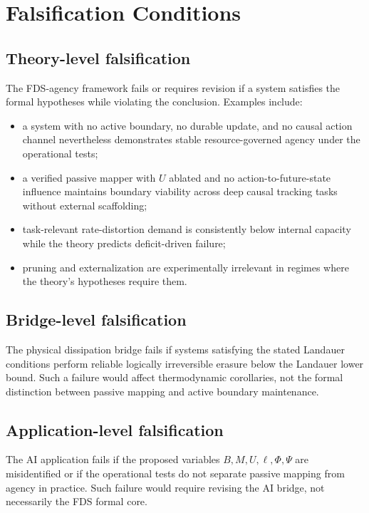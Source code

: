 \documentclass[10pt,a4paper,twocolumn,aps,prl]{revtex4-2}
\begin{document}
\section{Falsification Conditions}

\subsection{Theory-level falsification}

The FDS-agency framework fails or requires revision if a system satisfies the formal hypotheses while violating the conclusion. Examples include:
\begin{itemize}[leftmargin=2em]
    \item a system with no active boundary, no durable update, and no causal action channel nevertheless demonstrates stable resource-governed agency under the operational tests;
    \item a verified passive mapper with $U$ ablated and no action-to-future-state influence maintains boundary viability across deep causal tracking tasks without external scaffolding;
    \item task-relevant rate-distortion demand is consistently below internal capacity while the theory predicts deficit-driven failure;
    \item pruning and externalization are experimentally irrelevant in regimes where the theory's hypotheses require them.
\end{itemize}

\subsection{Bridge-level falsification}

The physical dissipation bridge fails if systems satisfying the stated Landauer conditions perform reliable logically irreversible erasure below the Landauer lower bound. Such a failure would affect thermodynamic corollaries, not the formal distinction between passive mapping and active boundary maintenance.

\subsection{Application-level falsification}

The AI application fails if the proposed variables $B,M,U,\ell,\Phi,\Psi$ are misidentified or if the operational tests do not separate passive mapping from agency in practice. Such failure would require revising the AI bridge, not necessarily the FDS formal core.
\end{document}
